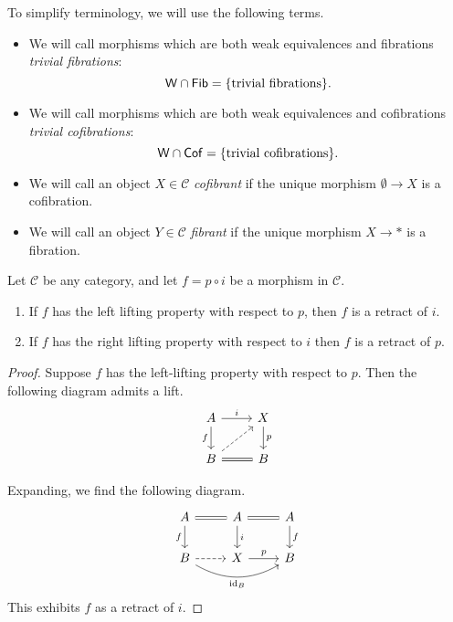 \documentclass[main.tex]{subfiles}
\begin{document}
To simplify terminology, we will use the following terms.
\begin{itemize}
  \item We will call morphisms which are both weak equivalences and fibrations \emph{trivial fibrations}:
    \begin{equation*}
      \mathsf{W} \cap \mathsf{Fib} = \{\text{trivial fibrations}\}.
    \end{equation*}

  \item We will call morphisms which are both weak equivalences and cofibrations \emph{trivial cofibrations}:
    \begin{equation*}
      \mathsf{W} \cap \mathsf{Cof} = \{\text{trivial cofibrations}\}.
    \end{equation*}

  \item We will call an object $X \in \mathcal{C}$ \emph{cofibrant} if the unique morphism $\emptyset \to X$ is a cofibration.

  \item We will call an object $Y \in \mathcal{C}$ \emph{fibrant} if the unique morphism $X \to *$ is a fibration.
\end{itemize}

\begin{lemma}
  \label{lemma:retract_argument}
  Let $\mathcal{C}$ be any category, and let $f = p \circ i$ be a morphism in $\mathcal{C}$.
  \begin{enumerate}
    \item If $f$ has the left lifting property with respect to $p$, then $f$ is a retract of $i$.

    \item If $f$ has the right lifting property with respect to $i$ then $f$ is a retract of $p$.
  \end{enumerate}
\end{lemma}
\begin{proof}
  Suppose $f$ has the left-lifting property with respect to $p$. Then the following diagram admits a lift.
  \begin{equation*}
    \begin{tikzcd}
      A
      \arrow[r, "i"]
      \arrow[d, swap, "f"]
      & X
      \arrow[d, "p"]
      \\
      B
      \arrow[r, equals]
      \arrow[ur, dashed]
      & B
    \end{tikzcd}
  \end{equation*}

  Expanding, we find the following diagram.
  \begin{equation*}
    \begin{tikzcd}
      A
      \arrow[r, equals]
      \arrow[d, swap, "f"]
      & A
      \arrow[d, "i"]
      \arrow[r, equals]
      & A
      \arrow[d, "f"]
      \\
      B
      \arrow[r, dashed]
      \arrow[rr, bend right, swap, "\id_{B}"]
      & X
      \arrow[r, "p"]
      & B
    \end{tikzcd}
  \end{equation*}
  This exhibits $f$ as a retract of $i$.
\end{proof}
\end{document}
